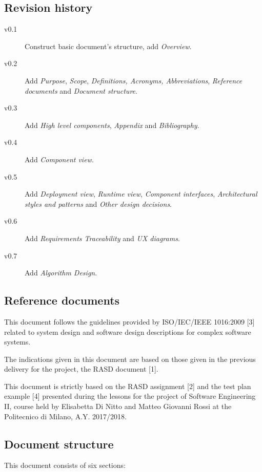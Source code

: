 \documentclass{article}
\begin{document}
	\subsection{Revision history}
	\begin{description}
		\item [v0.1] Construct basic document's structure, add \textit{Overview}.
		\item [v0.2] Add \textit{Purpose}, \textit{Scope}, \textit{Definitions, Acronyms, Abbreviations}, \textit{Reference documents} and \textit{Document structure}.
		\item [v0.3] Add \textit{High level components}, \textit{Appendix} and \textit{Bibliography}.
		\item [v0.4] Add \textit{Component view}.
		\item [v0.5] Add \textit{Deployment view}, \textit{Runtime view}, \textit{Component interfaces}, \textit{Architectural styles and patterns} and \textit{Other design decisions}.
		\item [v0.6] Add \textit{Requirements Traceability} and \textit{UX diagrams}.
		\item [v0.7] Add \textit{Algorithm Design}.
	\end{description}
	
	
	\subsection{Reference documents}
	This document follows the guidelines provided by ISO/IEC/IEEE 1016:2009 [3] related to system design and software design descriptions for complex software systems.

	\bigskip
	The indications given in this document are based on those given in the previous delivery for the project, the RASD document [1].
	
	\bigskip
	This document is strictly based on the RASD assignment [2] and the test plan example [4] presented during the lessons for the project of Software Engineering II, course held by Elisabetta Di Nitto and Matteo Giovanni Rossi at the Politecnico di Milano, A.Y. 2017/2018.
	
	
	\subsection{Document structure}

	This document consists of six sections:
\end{document}
